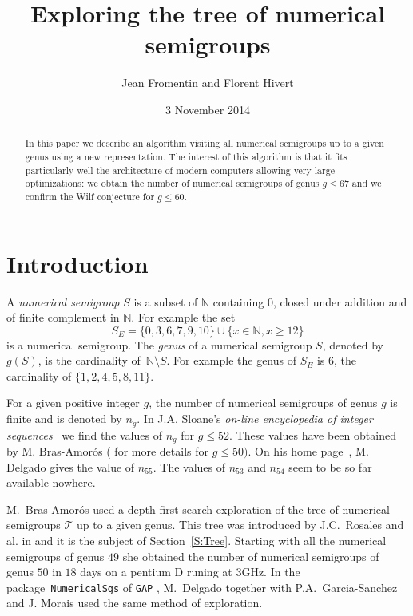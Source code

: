 \documentclass[reqno]{amsart}
\title{Exploring the tree of numerical semigroups}
\author{Jean Fromentin and  Florent Hivert}
\date{3 November 2014}
\theoremstyle{plain}
\theoremstyle{definition}
\renewcommand{\leq}{\leqslant}
\renewcommand{\geq}{\geqslant}
\newcommand{\NN}{\mathbb{N}}
\renewcommand{\tt}[1]{\texttt{#1}}
\begin{document}
\maketitle

\begin{abstract}
  In this paper we describe an algorithm visiting all numerical semigroups
  up to a given genus using a new representation. The
  interest of this algorithm is that it fits particularly well the
  architecture of modern computers allowing very large optimizations: we obtain the number of numerical semigroups of genus $g\leq  67$ and we confirm the Wilf conjecture for $g\leq 60$.
  
\end{abstract}

\vspace{1em}

\section*{Introduction}

A \emph{numerical semigroup} $S$ is a subset of $\NN$ containing $0$, closed under addition and of finite complement in $\NN$.  
For example the set 
\begin{equation}
\label{E:NSG}
S_E=\{0,3,6,7,9,10\}\cup\{x\in\NN, x\geq 12\}
\end{equation}
is a numerical semigroup.
The \emph{genus} of a numerical semigroup $S$, denoted by~$g(S)$, is the cardinality of~$\NN\setminus S$.
 For example the genus of $S_E$ is $6$,  the cardinality of $\{1,2,4,5,8,11\}$.

For a given positive integer $g$, the number of numerical semigroups of genus $g$ is finite and is denoted by $n_g$. 
In  J.A. Sloane's \emph{on-line encyclopedia of integer sequences}~\cite{OEIS} we find the values of $n_g$ for $g\leq 52$. 
These values have been obtained by M. Bras-Amor\'os (\cite{BrasAmoros2008} for more details for $g\leq 50)$. 
On his home page~\cite{Delgado}, M. Delgado  gives the value of $n_{55}$. 
The values of $n_{53}$ and $n_{54}$ seem to be so far available nowhere.

M.~Bras-Amor\'os used a depth first search exploration of the tree of numerical semigroups $\mathcal{T}$ up to a given genus.
This tree was introduced by J.C.~Rosales and al. in \cite{Rosales} and it is the subject of Section~\ref{S:Tree}.
Starting with all the numerical semigroups of genus $49$ she obtained the number of numerical semigroups of genus $50$ in $18$ days on a pentium D runing at $3$GHz. 
In the package~\tt{NumericalSgs} \cite{NumericalSgps} of \tt{GAP} \cite{GAP}, M.~Delgado together with P.A.~Garcia-Sanchez and J. Morais used the same method of exploration.
\end{document}

